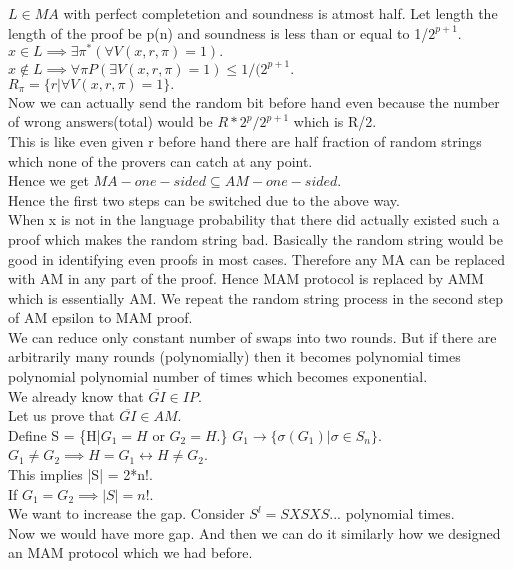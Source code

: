 \documentclass[solution,addpoints,12pt]{exam}
\begin{document}
$L \in MA$ with perfect completetion and soundness is atmost
half. Let length the length of the proof be p(n) and soundness
is less than or equal to 1/$2^{p+1}$.\\
$x \in L \implies \exists \pi^* (\forall V(x, r, \pi) = 1).$\\
$x \not \in L \implies \forall \pi P(\exists V(x, r, \pi) = 1) \le 1/(2^{p+1}.$\\
$R_\pi = \{r | \forall V(x, r, \pi) = 1\}.$\\
Now we can actually send the random bit before hand even because the
number of wrong answers(total) would be $R*2^p/2^{p+1}$ which is R/2.\\
This is like even given r before hand there are half fraction
of random strings which none of the provers can catch at any point.\\
Hence we get $MA-one-sided \subseteq AM-one-sided$.\\
Hence the first two steps can be switched due to the above way.\\
When x is not in the language probability that there did
actually existed such a proof which makes the random string
bad. Basically the random string would be good in identifying
even proofs in most cases. Therefore any MA can be replaced with
AM in any part of the proof. Hence MAM protocol is replaced
by AMM which is essentially AM.
We repeat the random string process in the second step of AM epsilon
to MAM proof.\\
We can reduce only constant number of swaps into two rounds. But
if there are arbitrarily many rounds (polynomially) then it becomes
polynomial times polynomial polynomial number of times which
becomes exponential.\\
We already know that $\overline{GI} \in IP$.\\
Let us prove that $\overline{GI} \in AM$.\\
Define S = \{H|$G_1 = H$ or $G_2 = H$.\}
$G_1 \rightarrow \{\sigma(G_1)|\sigma \in S_n\}$.\\
$G_1 \ne G_2 \implies H = G_1 \leftrightarrow H \ne G_2$.\\
This implies |S| = 2*n!.\\
If $G_1 = G_2 \implies |S| = n!$.\\
We want to increase the gap. Consider $S^l = SXSXS...$ polynomial times.\\
Now we would have more gap. And then we can do it similarly how we designed
an MAM protocol which we had before.\\
\end{document}
